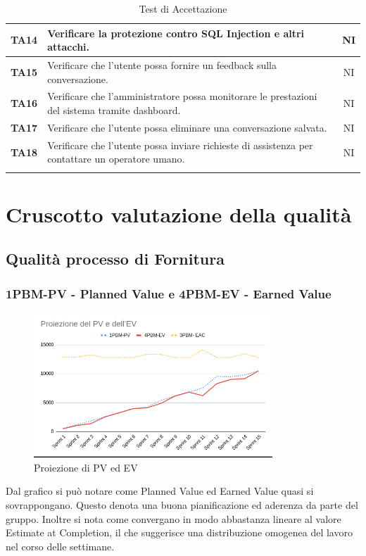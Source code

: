\documentclass{article}
\begin{document}
\begin{longtable}{|>{\centering\arraybackslash}m{}|>{\raggedright\arraybackslash}m{}|c|}
    \hline
    \textbf{TA14} & Verificare la protezione contro SQL Injection e altri attacchi. & NI\\
    \hline
    \textbf{TA15} & Verificare che l’utente possa fornire un feedback sulla conversazione. & NI\\
    \hline
    \textbf{TA16} & Verificare che l’amministratore possa monitorare le prestazioni del sistema tramite dashboard. & NI\\
    \hline
    \textbf{TA17} & Verificare che l’utente possa eliminare una conversazione salvata.& NI\\
    \hline
    \textbf{TA18} & Verificare che l’utente possa inviare richieste di assistenza per contattare un operatore umano.& NI\\
    \hline
    \caption{Test di Accettazione}
\end{longtable}


\section{Cruscotto valutazione della qualità}


    \subsection{Qualità processo di Fornitura}
        \subsubsection{1PBM-PV - Planned Value e 4PBM-EV - Earned Value}
        \begin{figure}[H]
            \centering
            \includegraphics[width=0.8\textwidth]{../../img/pdq_charts/chart1-proiezionePVEV.png}
            \caption{Proiezione di PV ed EV}
        \end{figure}
        Dal grafico si può notare come Planned Value ed Earned Value quasi si sovrappongano. Questo denota una buona pianificazione ed aderenza da parte del gruppo. Inoltre si nota come convergano in modo abbastanza lineare al valore Estimate at Completion, il che suggerisce una distribuzione omogenea del lavoro nel corso delle settimane.
\end{document}
